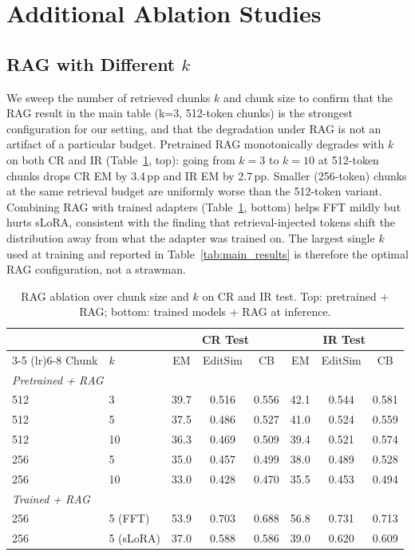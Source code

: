 \documentclass{llmxive}
\begin{document}
\section{Additional Ablation Studies}
\label{app:additional_results}

\subsection{RAG with Different \texorpdfstring{$k$}{k}}
\label{app:rag_k}

We sweep the number of retrieved chunks $k$ and chunk size to confirm that the RAG result in the main table (k{=}3, 512-token chunks) is the strongest configuration for our setting, and that the degradation under RAG is not an artifact of a particular budget.
Pretrained RAG monotonically degrades with $k$ on both CR and IR (Table~\ref{tab:rag_k}, top): going from $k{=}3$ to $k{=}10$ at 512-token chunks drops CR EM by 3.4\,pp and IR EM by 2.7\,pp.
Smaller (256-token) chunks at the same retrieval budget are uniformly worse than the 512-token variant.
Combining RAG with trained adapters (Table~\ref{tab:rag_k}, bottom) helps FFT mildly but hurts sLoRA, consistent with the finding that retrieval-injected tokens shift the distribution away from what the adapter was trained on.
The largest single $k$ used at training and reported in Table~\ref{tab:main_results} is therefore the optimal RAG configuration, not a strawman.

\begin{table}[t]
\begin{small}
\begin{center}
\begin{tabular}{llccc@{\hskip 12pt}ccc}
\toprule
& & \multicolumn{3}{c}{CR Test} & \multicolumn{3}{c}{IR Test} \\
\cmidrule(lr){3-5} \cmidrule(lr){6-8}
Chunk & $k$ & EM & EditSim & CB & EM & EditSim & CB \\
\midrule
\multicolumn{8}{l}{\emph{Pretrained + RAG}} \\
\midrule
512 & 3 & 39.7 & 0.516 & 0.556 & 42.1 & 0.544 & 0.581 \\
512 & 5 & 37.5 & 0.486 & 0.527 & 41.0 & 0.524 & 0.559 \\
512 & 10 & 36.3 & 0.469 & 0.509 & 39.4 & 0.521 & 0.574 \\
256 & 5 & 35.0 & 0.457 & 0.499 & 38.0 & 0.489 & 0.528 \\
256 & 10 & 33.0 & 0.428 & 0.470 & 35.5 & 0.453 & 0.494 \\
\midrule
\multicolumn{8}{l}{\emph{Trained + RAG}} \\
\midrule
256 & 5 (FFT) & 53.9 & 0.703 & 0.688 & 56.8 & 0.731 & 0.713 \\
256 & 5 (sLoRA) & 37.0 & 0.588 & 0.586 & 39.0 & 0.620 & 0.609 \\
\bottomrule
\end{tabular}


\end{center}
\end{small}
\caption{RAG ablation over chunk size and $k$ on CR and IR test. Top: pretrained + RAG; bottom: trained models + RAG at inference.}
\label{tab:rag_k}
\end{table}
\end{document}
